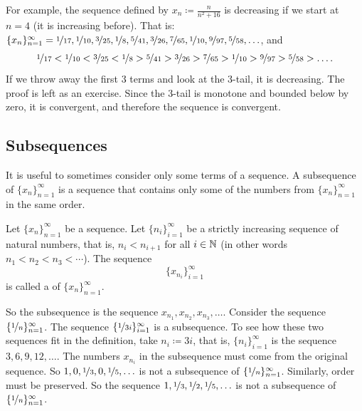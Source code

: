 For example, the sequence defined by $x_n \coloneqq \frac{n}{n^2+16}$ is decreasing
if we start at $n=4$ (it is increasing before).  That is:
$\{ x_n \}_{n=1}^\infty =
\nicefrac{1}{17},
\nicefrac{1}{10},
\nicefrac{3}{25},
\nicefrac{1}{8},
\nicefrac{5}{41},
\nicefrac{3}{26},
\nicefrac{7}{65},
\nicefrac{1}{10},
\nicefrac{9}{97},
\nicefrac{5}{58},\ldots$, and 
\begin{equation*}
\nicefrac{1}{17} <
\nicefrac{1}{10} <
\nicefrac{3}{25} <
\nicefrac{1}{8} >
\nicefrac{5}{41} >
\nicefrac{3}{26} >
\nicefrac{7}{65} >
\nicefrac{1}{10} >
\nicefrac{9}{97} >
\nicefrac{5}{58} > \ldots .
\end{equation*}
If we throw away the first 3 terms
and look at the 3-tail, it is decreasing.  The proof is left as an exercise.  Since the 3-tail
is monotone and bounded below by zero, it is convergent, and therefore the sequence is convergent.

\subsection{Subsequences}

It is useful to sometimes consider only some terms of a sequence.
A subsequence of $\{ x_n \}_{n=1}^\infty$ is a sequence that contains
only some of the numbers from $\{ x_n \}_{n=1}^\infty$ in the same order.

\begin{defn}
Let $\{ x_n \}_{n=1}^\infty$ be a sequence.
Let $\{ n_i \}_{i=1}^\infty$ be a strictly increasing sequence of natural
numbers, that is, $n_i < n_{i+1}$ for all $i \in {\mathbb{N}}$ (in other words $n_1 < n_2 < n_3 < \cdots$).  
The sequence
\begin{equation*}
\{ x_{n_i} \}_{i=1}^\infty
\end{equation*}
is called 
a \emph{} of $\{ x_n \}_{n=1}^\infty$.
\end{defn}

So the subsequence is the sequence $x_{n_1},x_{n_2},x_{n_3},\ldots$.
Consider the sequence $\{ \nicefrac{1}{n} \}_{n=1}^\infty$.  The sequence
$\{ \nicefrac{1}{3i} \}_{i=1}^\infty$ is a subsequence.  To see how these two
sequences fit in the definition, take $n_i \coloneqq 3i$,
that is, $\{ n_i \}_{i=1}^\infty$ is the
sequence $3,6,9,12,\ldots$.  
The numbers $x_{n_i}$ in the
subsequence must come from the original sequence.  So $1,0,\nicefrac{1}{3},0,
\nicefrac{1}{5},\ldots$
is not a subsequence of $\{ \nicefrac{1}{n} \}_{n=1}^\infty$.  Similarly, order
must be preserved.  So
the sequence $1,\nicefrac{1}{3},\nicefrac{1}{2},\nicefrac{1}{5},\ldots$
is not a subsequence of $\{ \nicefrac{1}{n} \}_{n=1}^\infty$.

